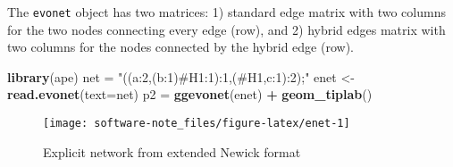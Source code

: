 \documentclass[]{IEEEtran}
\newenvironment{Shaded}{\begin{snugshade}}{\end{snugshade}}
\newcommand{\DataTypeTok}[1]{\textcolor[rgb]{0.13,0.29,0.53}{#1}}
\newcommand{\KeywordTok}[1]{\textcolor[rgb]{0.13,0.29,0.53}{\textbf{#1}}}
\newcommand{\NormalTok}[1]{#1}
\newcommand{\OperatorTok}[1]{\textcolor[rgb]{0.81,0.36,0.00}{\textbf{#1}}}
\newcommand{\StringTok}[1]{\textcolor[rgb]{0.31,0.60,0.02}{#1}}
\begin{document}
The \texttt{evonet} object has two matrices: 1) standard edge matrix with two columns for the two nodes connecting every edge (row), and 2) hybrid edges matrix with two columns for the nodes connected by the hybrid edge (row).

\begin{Shaded}
\begin{Highlighting}[]
\KeywordTok{library}\NormalTok{(ape)}
\NormalTok{net =}\StringTok{ "((a:2,(b:1)#H1:1):1,(#H1,c:1):2);"}
\NormalTok{enet <-}\StringTok{ }\KeywordTok{read.evonet}\NormalTok{(}\DataTypeTok{text=}\NormalTok{net)}
\NormalTok{p2 =}\StringTok{ }\KeywordTok{ggevonet}\NormalTok{(enet) }\OperatorTok{+}\StringTok{ }\KeywordTok{geom_tiplab}\NormalTok{() }
\end{Highlighting}
\end{Shaded}

\begin{figure}[H]

{\centering \texttt{[image: software-note\_files/figure-latex/enet-1]} 

}

\caption{Explicit network from extended Newick format}\label{fig:enet}
\end{figure}


\end{document}
